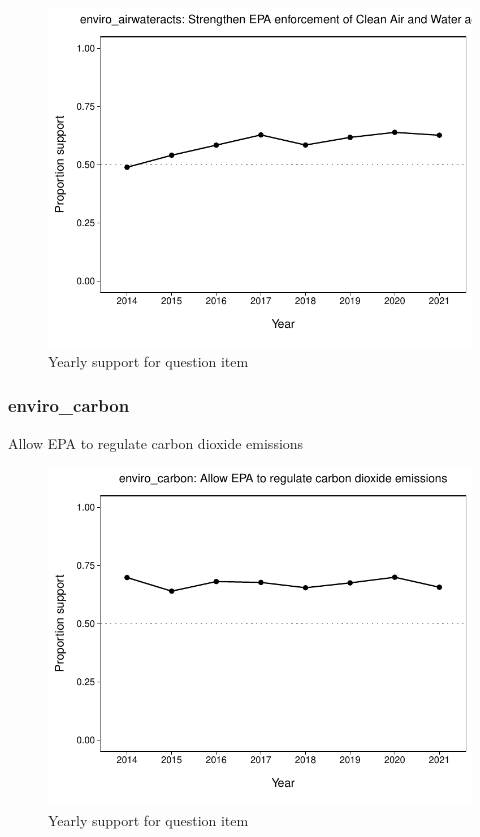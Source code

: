 \documentclass[
  12pt]{article}
\begin{document}
\begin{figure}

{\centering \includegraphics{error-checking_files/figure-latex/unnamed-chunk-3-7} 

}

\caption{Yearly support for question item}\label{fig:unnamed-chunk-3-7}
\end{figure}

\hypertarget{enviro_carbon}{%
\subsubsection{enviro\_carbon}\label{enviro_carbon}}

Allow EPA to regulate carbon dioxide emissions

\begin{figure}

{\centering \includegraphics{error-checking_files/figure-latex/unnamed-chunk-3-8} 

}

\caption{Yearly support for question item}\label{fig:unnamed-chunk-3-8}
\end{figure}
\end{document}
